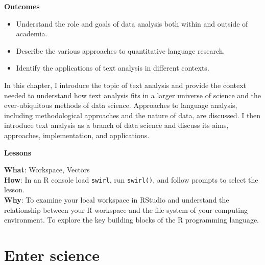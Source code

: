 \documentclass[
  letterpaper,
]{latex/krantz}
\providecommand{\tightlist}{%
  \setlength{\itemsep}{0pt}\setlength{\parskip}{0pt}}\usepackage{longtable,booktabs,array}
\theoremstyle{definition}
\theoremstyle{remark}
\begin{document}
\begin{tcolorbox}[enhanced jigsaw, breakable, leftrule=.75mm, arc=.35mm, colframe=quarto-callout-color-frame, colback=white, left=2mm, bottomrule=.15mm, rightrule=.15mm, toprule=.15mm, opacityback=0]

\textbf{ Outcomes}

\begin{itemize}
\tightlist
\item
  Understand the role and goals of data analysis both within and outside
  of academia.
\item
  Describe the various approaches to quantitative language research.
\item
  Identify the applications of text analysis in different contexts.
\end{itemize}

\end{tcolorbox}

In this chapter, I introduce the topic of text analysis and provide the
context needed to understand how text analysis fits in a larger universe
of science and the ever-ubiquitous methods of data science. Approaches
to language analysis, including methodological approaches and the nature
of data, are discussed. I then introduce text analysis as a branch of
data science and discuss its aims, approaches, implementation, and
applications.

\begin{tcolorbox}[enhanced jigsaw, breakable, leftrule=.75mm, arc=.35mm, colframe=quarto-callout-color-frame, colback=white, left=2mm, bottomrule=.15mm, rightrule=.15mm, toprule=.15mm, opacityback=0]

\textbf{ Lessons}

\textbf{What}: Workspace, Vectors\\
\textbf{How}: In an R console load \texttt{swirl}, run \texttt{swirl()},
and follow prompts to select the lesson.\\
\textbf{Why}: To examine your local workspace in RStudio and understand
the relationship between your R workspace and the file system of your
computing environment. To explore the key building blocks of the R
programming language.

\end{tcolorbox}

\section{Enter science}\label{sec-enter-science}
\end{document}
